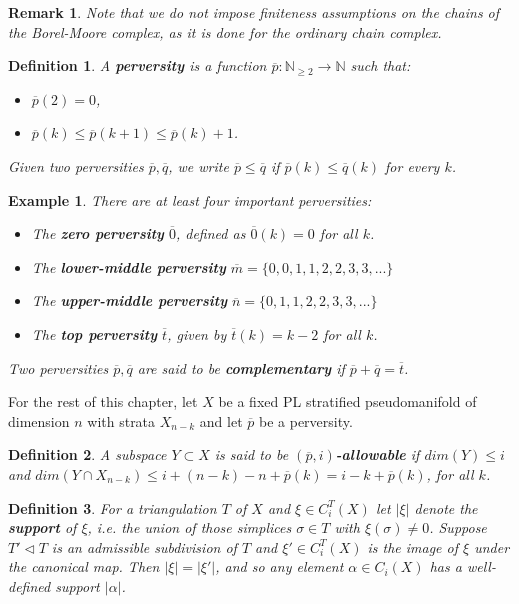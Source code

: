 \documentclass[11pt]{book}
\newtheorem{definition}{Definition}
\newtheorem{remark}{Remark}
\newtheorem{example}{Example}
\begin{document}
\begin{remark}
Note that we do not impose finiteness assumptions on the chains of the Borel-Moore complex, as it is done for the ordinary chain complex.
\end{remark}

\begin{definition}
A \textbf{perversity} is a function $\overline{p}: \mathbb{N}_{\geq 2} \to \mathbb{N}$ such that:
\begin{itemize}
\item $\overline{p}(2)=0$,
\item $\overline{p}(k) \leq \overline{p}(k+1) \leq \overline{p}(k)+1$.
\end{itemize}
Given two perversities $\overline{p}, \overline{q}$, we write $\overline{p} \leq \overline{q}$ if $\overline{p}(k) \leq \overline{q}(k)$ for every $k$.
\end{definition}

\begin{example}
There are at least four important perversities:
\begin{itemize}
\item The \textbf{zero perversity} $\overline{0}$, defined as $\overline{0}(k)=0$ for all $k$.
\item The \textbf{lower-middle perversity} $\overline{m}= \{ 0,0,1,1,2,2,3,3,... \}$
\item The \textbf{upper-middle perversity} $\overline{n}= \{ 0,1,1,2,2,3,3,... \}$
\item The \textbf{top perversity} $\overline{t}$, given by $\overline{t}(k)=k-2$ for all $k$.
\end{itemize}
Two perversities $\overline{p}, \overline{q}$ are said to be \textbf{complementary} if $\overline{p}+ \overline{q}= \overline{t}$.
\end{example}


For the rest of this chapter, let $X$ be a fixed PL stratified pseudomanifold of dimension $n$ with strata $X_{n-k}$  and let $\overline{p}$ be a perversity.

\begin{definition}
A subspace $Y \subset X$ is said to be \textbf{$(\overline{p},i)$-allowable} if $dim(Y) \leq i$ and $dim(Y \cap X_{n-k}) \leq i+(n-k)-n+ \overline{p}(k)=i-k+\overline{p}(k)$, for all $k$.
\end{definition}

\begin{definition}
For a triangulation $T$ of $X$ and $\xi \in C_i^T(X)$ let $|\xi|$ denote the \textbf{support} of $\xi$, i.e. the union of those simplices $\sigma \in T$ with $\xi(\sigma) \neq 0$. Suppose $T' \lhd T$ is an admissible subdivision of $T$ and $\xi' \in C_i^{T}(X)$ is the image of $\xi$ under the canonical map. Then $|\xi|=|\xi'|$, and so any element $\alpha \in C_i(X)$ has a well-defined support $|\alpha|$.
\end{definition}
\end{document}
